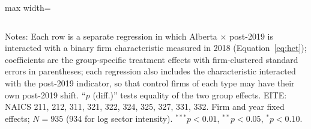 \begin{table}[htbp]
\begin{adjustbox}{max width=\textwidth}
\begin{tabular}{lccccc}
\bottomrule
\end{tabular}
\end{adjustbox}
\par\vspace{3pt}\begin{minipage}{\textwidth}\footnotesize
Notes: Each row is a separate regression in which Alberta $\times$ post-2019 is interacted with a binary firm characteristic measured in 2018 (Equation~\ref{eq:het}); coefficients are the group-specific treatment effects with firm-clustered standard errors in parentheses; each regression also includes the characteristic interacted with the post-2019 indicator, so that control firms of each type may have their own post-2019 shift. ``$p$ (diff.)'' tests equality of the two group effects. EITE: NAICS 211, 212, 311, 321, 322, 324, 325, 327, 331, 332. Firm and year fixed effects; $N=935$ (934 for log sector intensity). $^{***}p<0.01$, $^{**}p<0.05$, $^{*}p<0.10$.
\end{minipage}
\end{table}

